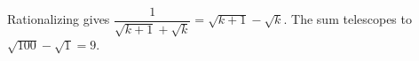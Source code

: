 Rationalizing gives $\dfrac{1}{\sqrt{k+1}+\sqrt k}=\sqrt{k+1}-\sqrt k$. The sum telescopes to $\sqrt{100}-\sqrt1=\boxed9$.
